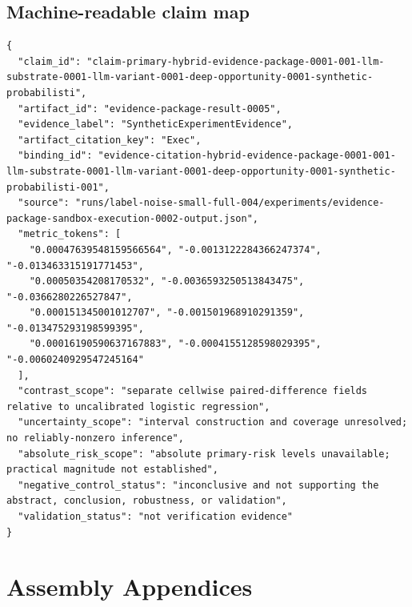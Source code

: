 \documentclass{article}
\begin{document}
\subsection*{Machine-readable claim map}
\begin{verbatim}
{
  "claim_id": "claim-primary-hybrid-evidence-package-0001-001-llm-substrate-0001-llm-variant-0001-deep-opportunity-0001-synthetic-probabilisti",
  "artifact_id": "evidence-package-result-0005",
  "evidence_label": "SyntheticExperimentEvidence",
  "artifact_citation_key": "Exec",
  "binding_id": "evidence-citation-hybrid-evidence-package-0001-001-llm-substrate-0001-llm-variant-0001-deep-opportunity-0001-synthetic-probabilisti-001",
  "source": "runs/label-noise-small-full-004/experiments/evidence-package-sandbox-execution-0002-output.json",
  "metric_tokens": [
    "0.00047639548159566564", "-0.0013122284366247374", "-0.013463315191771453",
    "0.00050354208170532", "-0.0036593250513843475", "-0.0366280226527847",
    "0.000151345001012707", "-0.001501968910291359", "-0.013475293198599395",
    "0.00016190590637167883", "-0.0004155128598029395", "-0.0060240929547245164"
  ],
  "contrast_scope": "separate cellwise paired-difference fields relative to uncalibrated logistic regression",
  "uncertainty_scope": "interval construction and coverage unresolved; no reliably-nonzero inference",
  "absolute_risk_scope": "absolute primary-risk levels unavailable; practical magnitude not established",
  "negative_control_status": "inconclusive and not supporting the abstract, conclusion, robustness, or validation",
  "validation_status": "not verification evidence"
}
\end{verbatim}

\appendix
\section*{Assembly Appendices}
\end{document}
